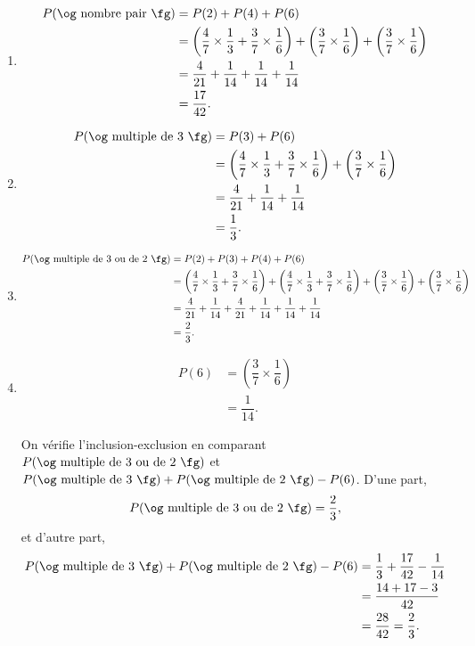 {	\begin{enumerate}
		\item
			\begin{align*}
				P(\text{\og nombre pair \fg}) &= P(2) + P(4) + P(6) \\
					&= \left( \dfrac47 \times \dfrac13 + \dfrac37\times\dfrac16 \right) + \left( \dfrac37 \times \dfrac16 \right) + \left( \dfrac37 \times \dfrac16 \right) \\
					&= \dfrac4{21} + \dfrac1{14} + \dfrac1{14} + \dfrac1{14} \\
					&= \dfrac{17}{42}.
			\end{align*}
		\item
			\begin{align*}
				P(\text{\og multiple de $3$ \fg}) &= P(3) + P(6) \\
					&= \left( \dfrac47 \times \dfrac13 + \dfrac37\times\dfrac16 \right) + \left( \dfrac37 \times \dfrac16 \right) \\
					&= \dfrac4{21} + \dfrac1{14} + \dfrac1{14} \\
					&= \dfrac13.
			\end{align*}
		\item
			\begin{align*}
				P(\text{\og multiple de $3$ ou de $2$ \fg}) &= P(2) + P(3) + P(4) + P(6) \\
					&= \left( \dfrac47 \times \dfrac13 + \dfrac37\times\dfrac16 \right) + \left( \dfrac47 \times \dfrac13 + \dfrac37\times\dfrac16 \right) + \left( \dfrac37 \times \dfrac16 \right) + \left( \dfrac37 \times \dfrac16 \right) \\
					&= \dfrac4{21} + \dfrac1{14} + \dfrac4{21} + \dfrac1{14} + \dfrac1{14} + \dfrac1{14} \\
					&= \dfrac23.
			\end{align*}
		\item 
			\begin{align*}
				P(6) &=\left( \dfrac37 \times \dfrac16 \right) \\
					&= \dfrac1{14}.
			\end{align*}
			
		On vérifie l'inclusion-exclusion en comparant $P(\text{\og multiple de $3$ ou de $2$ \fg})$ et $P(\text{\og multiple de $3$ \fg}) + P(\text{\og multiple de $2$ \fg}) - P(6)$.
		D'une part,
			\[ P(\text{\og multiple de $3$ ou de $2$ \fg}) = \dfrac23, \]
		et d'autre part,
			\begin{align*}
				P(\text{\og multiple de $3$ \fg}) + P(\text{\og multiple de $2$ \fg}) - P(6) &= \dfrac13 + \dfrac{17}{42} - \dfrac1{14} \\
				&= \dfrac{14 + 17 - 3}{42} \\
				&= \dfrac{28}{42} = \dfrac23.
			\end{align*}
	\end{enumerate}
}



